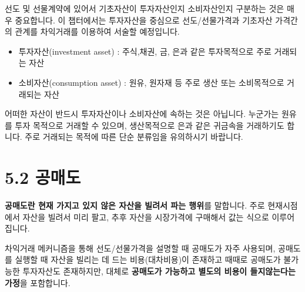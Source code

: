 \documentclass[
  letterpaper,
  DIV=11,
  numbers=noendperiod]{scrreprt}
\begin{document}

선도 및 선물계약에 있어서 기초자산이 투자자산인지 소비자산인지 구분하는
것은 매우 중요합니다. 이 챕터에서는 투자자산을 중심으로 선도/선물가격과
기초자산 가격간의 관계를 차익거래를 이용하여 서술할 예정입니다.

\begin{itemize}
\item
  투자자산(investment asset) : 주식,채권, 금, 은과 같은 투자목적으로
  주로 거래되는 자산
\item
  소비자산(consumption asset) : 원유, 원자재 등 주로 생산 또는
  소비목적으로 거래되는 자산
\end{itemize}

\begin{tcolorbox}[enhanced jigsaw, titlerule=0mm, bottomtitle=1mm, left=2mm, title=\textcolor{quarto-callout-note-color}{\faInfo}\hspace{0.5em}{Note}, toptitle=1mm, bottomrule=.15mm, colframe=quarto-callout-note-color-frame, breakable, opacityback=0, rightrule=.15mm, opacitybacktitle=0.6, coltitle=black, colback=white, arc=.35mm, colbacktitle=quarto-callout-note-color!10!white, toprule=.15mm, leftrule=.75mm]

어떠한 자산이 반드시 투자자산이나 소비자산에 속하는 것은 아닙니다.
누군가는 원유를 투자 목적으로 거래할 수 있으며, 생산목적으로 은과 같은
귀금속을 거래하기도 합니다. 주로 거래되는 목적에 따른 단순 분류임을
유의하시기 바랍니다.

\end{tcolorbox}

\section*{5.2 공매도}\label{uxacf5uxb9e4uxb3c4}


\textbf{공매도란 현재 가지고 있지 않은 자산을 빌려서 파는 행위}를
말합니다. 주로 현재시점에서 자산을 빌려서 미리 팔고, 추후 자산을
시장가격에 구매해서 값는 식으로 이루어집니다.

차익거래 메커니즘을 통해 선도/선물가격을 설명할 때 공매도가 자주
사용되며, 공매도를 실행할 때 자산을 빌리는 데 드는 비용(대차비용)이
존재하고 때때로 공매도가 불가능한 투자자산도 존재하지만, 대체로
\textbf{공매도가 가능하고 별도의 비용이 들지않는다는 가정}을 포함합니다.
\end{document}
